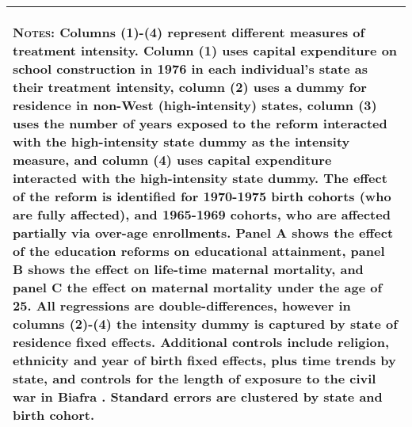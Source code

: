 \begin{subtables}
\begin{table}[htpb!]
\begin{center}
\begin{tabular}{p{5cm}cccc}
\multicolumn{5}{p{12.7cm}}{\begin{footnotesize}\textsc{Notes:} Columns (1)-(4) represent different measures of treatment intensity. Column (1) uses capital expenditure on school construction in 1976 in each individual's state as their treatment intensity, column (2) uses a dummy for residence in non-West (high-intensity) states, column (3) uses the number of years exposed to the reform interacted with the high-intensity state dummy as the intensity measure, and column (4) uses capital expenditure interacted with the high-intensity state dummy.  The effect of the reform is identified for 1970-1975 birth cohorts (who are fully affected), and 1965-1969 cohorts, who are affected partially via over-age enrollments. Panel A shows the effect of the education reforms on educational attainment, panel B shows the effect on life-time maternal mortality, and panel C the effect on maternal mortality under the age of 25.  All regressions are double-differences, however in columns (2)-(4) the intensity dummy is captured by state of residence fixed effects. Additional controls include religion, ethnicity and year of birth fixed effects, plus time trends by state, and controls for the length of exposure to the civil war in Biafra \citep{Akreshetal2012}.  Standard errors are clustered by state and birth cohort. \end{footnotesize}} \\									
\bottomrule									
\end{tabular}									
\end{center}									
\end{table}									



\end{subtables}
